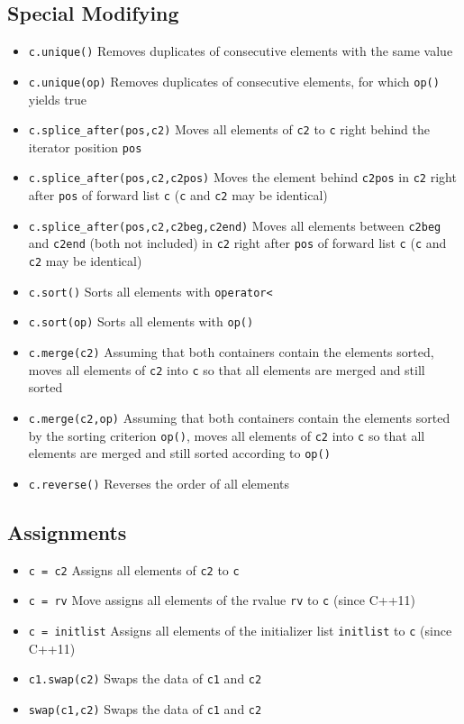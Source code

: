 \documentclass{report}
\begin{document}
\bigbreak \noindent 
\subsection{Special Modifying}
\begin{itemize}
    \item \texttt{c.unique()} Removes duplicates of consecutive elements with the same value
    \item \texttt{c.unique(op)} Removes duplicates of consecutive elements, for which \texttt{op()} yields true
    \item \texttt{c.splice\_after(pos,c2)} Moves all elements of \texttt{c2} to \texttt{c} right behind the iterator position \texttt{pos}
    \item \texttt{c.splice\_after(pos,c2,c2pos)} Moves the element behind \texttt{c2pos} in \texttt{c2} right after \texttt{pos} of forward list \texttt{c} (\texttt{c} and \texttt{c2} may be identical)
    \item \texttt{c.splice\_after(pos,c2,c2beg,c2end)} Moves all elements between \texttt{c2beg} and \texttt{c2end} (both not included) in \texttt{c2} right after \texttt{pos} of forward list \texttt{c} (\texttt{c} and \texttt{c2} may be identical)
    \item \texttt{c.sort()} Sorts all elements with \texttt{operator<}
    \item \texttt{c.sort(op)} Sorts all elements with \texttt{op()}
    \item \texttt{c.merge(c2)} Assuming that both containers contain the elements sorted, moves all elements of \texttt{c2} into \texttt{c} so that all elements are merged and still sorted
    \item \texttt{c.merge(c2,op)} Assuming that both containers contain the elements sorted by the sorting criterion \texttt{op()}, moves all elements of \texttt{c2} into \texttt{c} so that all elements are merged and still sorted according to \texttt{op()}
    \item \texttt{c.reverse()} Reverses the order of all elements
\end{itemize}

\pagebreak 
{}
\bigbreak \noindent 
\subsection{Assignments}
\begin{itemize}
    \item \texttt{c = c2} Assigns all elements of \texttt{c2} to \texttt{c}
    \item \texttt{c = rv} Move assigns all elements of the rvalue \texttt{rv} to \texttt{c} (since C++11)
    \item \texttt{c = initlist} Assigns all elements of the initializer list \texttt{initlist} to \texttt{c} (since C++11)
    \item \texttt{c1.swap(c2)} Swaps the data of \texttt{c1} and \texttt{c2}
    \item \texttt{swap(c1,c2)} Swaps the data of \texttt{c1} and \texttt{c2}
\end{itemize}
\end{document}
